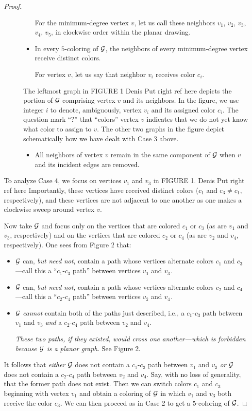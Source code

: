 \begin{proof}
\begin{description}
\begin{itemize}
For the minimum-degree vertex $v$, let us call these neighbors $v_1$,
$v_2$, $v_3$, $v_4$, $v_5$, in clockwise order within the planar
drawing.
\item
In every $5$-coloring of $\mbox{$\cal G$}$, the neighbors of every minimum-degree
vertex receive distinct colors.

For vertex $v$, let us say that neighbor $v_i$ receives color $c_i$.
\end{itemize}
The leftmost graph in FIGURE 1 
{Denis Put right ref here}
depicts the portion of $\mbox{$\cal G$}$ comprising
vertex $v$ and its neighbors.  In the figure, we use integer $i$ to
denote, ambiguously, vertex $v_i$ and its assigned color $c_i$.  The
question mark ``?'' that ``colors'' vertex $v$ indicates that we do not
yet know what color to assign to $v$.  The other two graphs in the
figure depict schematically how we have dealt with Case 3 above.
\begin{itemize}
\item
All neighbors of vertex $v$ remain in the same component of $\mbox{$\cal G$}$ when
$v$ and its incident edges are removed.
\end{itemize}
\end{description}
To analyze Case 4, we focus on vertices $v_1$ and $v_3$ in FIGURE 1.
{Denis Put right ref here}
Importantly, these vertices have received distinct colors ($c_1$ and $c_3
\neq c_1$, respectively), and these vertices are not adjacent to one
another as one makes a clockwise sweep around vertex $v$.

Now take $\mbox{$\cal G$}$ and focus only on the vertices that are colored $c_1$ or
$c_3$ (as are $v_1$ and $v_3$, respectively) and on the vertices that are
colored $c_2$ or $c_4$ (as are $v_2$ and $v_4$, respectively).  One
sees from Figure 2 that:
\begin{itemize}
\item
$\mbox{$\cal G$}$ can, {\em but need not}, contain a path whose vertices alternate
  colors $c_1$ and $c_3$---call this a ``$c_1$-$c_3$ path'' between
  vertices $v_1$ and $v_3$.
\item
$\mbox{$\cal G$}$ can, {\em but need not}, contain a path whose vertices alternate
  colors $c_2$ and $c_4$---call this a ``$c_2$-$c_4$ path'' between
  vertices $v_2$ and $v_4$.
\item
$\mbox{$\cal G$}$ {\em cannot} contain both of the paths just described, i.e., a
  $c_1$-$c_3$ path between $v_1$ and $v_3$ {\em and} a $c_2$-$c_4$ path
  between $v_2$ and $v_4$.

{\em These two paths, if they existed, would cross one another---which
  is forbidden because $\mbox{$\cal G$}$ is a {\em planar} graph.}  See Figure 2.
\end{itemize}
It follows that {\em either} $\mbox{$\cal G$}$ does not contain a $c_1$-$c_3$ path
between $v_1$ and $v_3$ {\em or} $\mbox{$\cal G$}$ does not contain a $c_2$-$c_4$
path between $v_2$ and $v_4$.  Say, with no loss of generality, that
the former path does not exist.  Then we can switch colors $c_1$ and
$c_3$ beginning with vertex $v_1$ and obtain a coloring of $\mbox{$\cal G$}$ in which
$v_1$ and $v_3$ both receive the color $c_3$.  We can then proceed as
in Case 2 to get a $5$-coloring of $\mbox{$\cal G$}$.


\end{proof}
